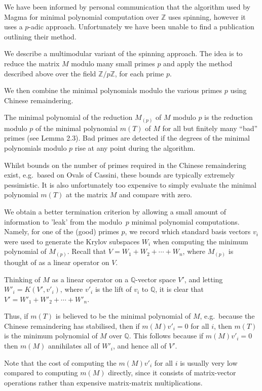 \documentclass{sig-alternate-05-2015}
\begin{document}
We have been informed by personal communication that the algorithm used by
Magma \cite{magma} for minimal polynomial computation over $\mathbb{Z}$ uses
spinning, however it uses a $p$-adic approach. Unfortunately
we have been unable to find a publication outlining their method.

We describe a multimodular variant of the spinning approach. The idea is to
reduce the matrix $M$ modulo many small primes $p$ and apply the method
described above over the field $\mathbb{Z}/p\mathbb{Z}$, for each prime $p$.

We then combine the minimal polynomials modulo the various primes $p$ using
Chinese remaindering.

The minimal polynomial of the reduction $M_{(p)}$ of $M$ modulo $p$ is the
reduction modulo $p$ of the minimal polynomial $m(T)$ of $M$ for all but
finitely many ``bad'' primes (see \cite{giesbrecht} Lemma 2.3). Bad primes
are detected if the degrees of the minimal polynomials modulo $p$ rise at
any point during the algorithm.

Whilst bounds on the number of primes required in the Chinese remaindering
exist, e.g.\ based on Ovals of Cassini, these bounds are typically extremely
pessimistic. It is also unfortunately too expensive to simply evaluate the
minimal polynomial $m(T)$ at the matrix $M$ and compare with zero.

We obtain a better termination criterion by allowing a small amount of
information to 'leak' from the modulo~$p$ minimal polynomial computations.
Namely, for one of the (good) primes $p$, we record which standard
basis vectors $v_i$ were used to generate the Krylov subspaces $W_i$ when
computing the minimum polynomial of $M_{(p)}$. Recall that
$V = W_1 + W_2 + \cdots + W_n$, where $M_{(p)}$ is thought of as a linear
operator on $V$.

Thinking of $M$ as a linear operator on a $\mathbb{Q}$-vector space $V'$,
and letting $W'_i = K(V', v'_i)$, where $v'_i$ is the lift of $v_i$ to
$\mathbb{Q}$, it is clear that $V' = W'_1 + W'_2 + \cdots + W'_n$.

Thus, if $m(T)$ is believed to be the minimal polynomial of $M$,
e.g.\ because the Chinese remaindering has stabilised, then if $m(M)v'_i = 0$
for all $i$, then $m(T)$ is the minimum polynomial of $M$ over $\mathbb{Q}$.
This follows because if $m(M)v'_i = 0$ then $m(M)$ annihilates all of $W'_i$,
and hence all of $V'$.

Note that the cost of computing the $m(M)v'_i$ for all $i$ is usually very low
compared to computing $m(M)$ directly, since it consists of matrix-vector
operations rather than expensive matrix-matrix multiplications.
\end{document}
